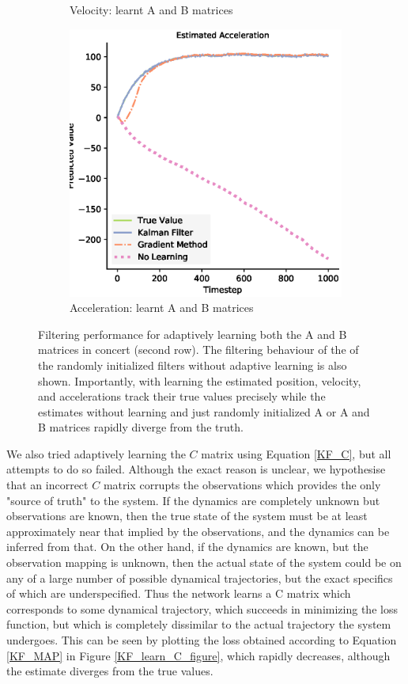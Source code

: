 \begin{figure}
\begin{subfigure}{0.49\textwidth}
 \caption{Velocity: learnt A and B matrices}
 \end{subfigure}
 \begin{subfigure}{0.49\textwidth}
 \centering
 \includegraphics[width=.95\linewidth]{chapter_3_figures/Estimated_Acceleration_AB_matrix.eps}
 \caption{Acceleration: learnt A and B matrices}
 \end{subfigure}
 \caption{Filtering performance for adaptively learning both the A and B matrices in concert (second row). The filtering behaviour of the of the randomly initialized filters without adaptive learning is also shown. Importantly, with learning the estimated position, velocity, and accelerations track their true values precisely while the estimates without learning and just randomly initialized A or A and B matrices rapidly diverge from the truth.}
\label{KF_learn_AB_figure}
\end{figure}

We also tried adaptively learning the $C$ matrix using Equation \ref{KF_C}, but all attempts to do so failed. Although the exact reason is unclear, we hypothesise that an incorrect $C$ matrix corrupts the observations which provides the only "source of truth" to the system. If the dynamics are completely unknown but observations are known, then the true state of the system must be at least approximately near that implied by the observations, and the dynamics can be inferred from that. On the other hand, if the dynamics are known, but the observation mapping is unknown, then the actual state of the system could be on any of a large number of possible dynamical trajectories, but the exact specifics of which are underspecified. Thus the network learns a C matrix which corresponds to some dynamical trajectory, which succeeds in minimizing the loss function, but which is completely dissimilar to the actual trajectory the system undergoes. This can be seen by plotting the loss obtained according to Equation \ref{KF_MAP} in Figure \ref{KF_learn_C_figure}, which rapidly decreases, although the estimate diverges from the true values.

